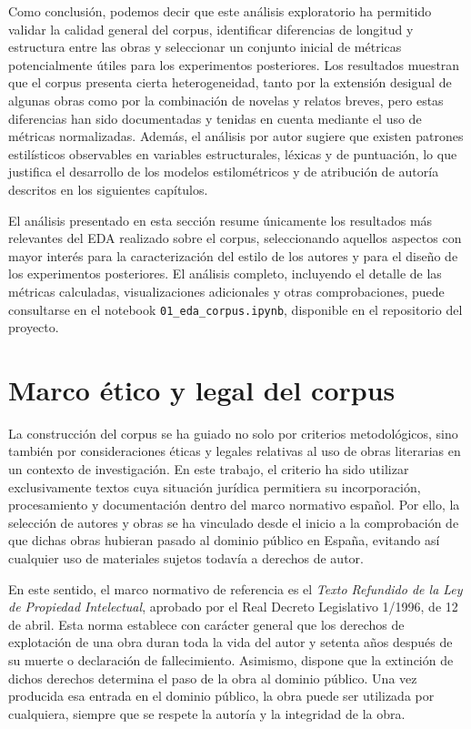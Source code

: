 \documentclass[IB]{TFUOC}%
\begin{document}
Como conclusión, podemos decir que este análisis exploratorio ha permitido validar la calidad general del corpus, identificar diferencias de longitud y estructura entre las obras y seleccionar un conjunto inicial de métricas potencialmente útiles para los experimentos posteriores. Los resultados muestran que el corpus presenta cierta heterogeneidad, tanto por la extensión desigual de algunas obras como por la combinación de novelas y relatos breves, pero estas diferencias han sido documentadas y tenidas en cuenta mediante el uso de métricas normalizadas. Además, el análisis por autor sugiere que existen patrones estilísticos observables en variables estructurales, léxicas y de puntuación, lo que justifica el desarrollo de los modelos estilométricos y de atribución de autoría descritos en los siguientes capítulos.

El análisis presentado en esta sección resume únicamente los resultados más relevantes del EDA realizado sobre el corpus, seleccionando aquellos aspectos con mayor interés para la caracterización del estilo de los autores y para el diseño de los experimentos posteriores. El análisis completo, incluyendo el detalle de las métricas calculadas, visualizaciones adicionales y otras comprobaciones, puede consultarse en el notebook \texttt{01\_eda\_corpus.ipynb}, disponible en el repositorio del proyecto.

\section{Marco ético y legal del corpus}

La construcción del corpus se ha guiado no solo por criterios metodológicos, sino también por consideraciones éticas y legales relativas al uso de obras literarias en un contexto de investigación. En este trabajo, el criterio ha sido utilizar exclusivamente textos cuya situación jurídica permitiera su incorporación, procesamiento y documentación dentro del marco normativo español. Por ello, la selección de autores y obras se ha vinculado desde el inicio a la comprobación de que dichas obras hubieran pasado al dominio público en España, evitando así cualquier uso de materiales sujetos todavía a derechos de autor.

En este sentido, el marco normativo de referencia es el \textit{Texto Refundido de la Ley de Propiedad Intelectual}, aprobado por el Real Decreto Legislativo 1/1996, de 12 de abril\cite{rld_1_1996}. Esta norma establece con carácter general que los derechos de explotación de una obra duran toda la vida del autor y setenta años después de su muerte o declaración de fallecimiento. Asimismo, dispone que la extinción de dichos derechos determina el paso de la obra al dominio público. Una vez producida esa entrada en el dominio público, la obra puede ser utilizada por cualquiera, siempre que se respete la autoría y la integridad de la obra.
\end{document}
